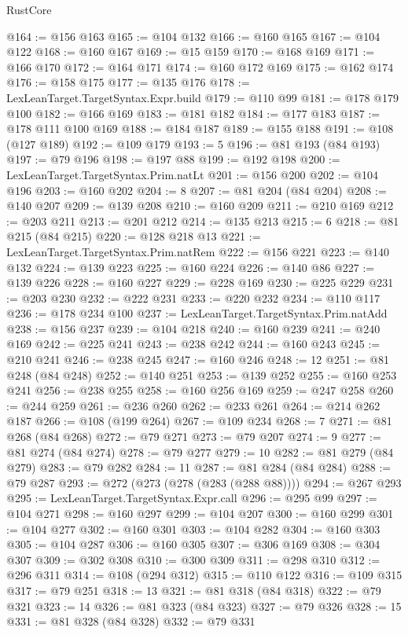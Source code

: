 \begin{lexlean}{RustCore}
\begin{coremodule}
@164 := @156 @163
@165 := @104 @132
@166 := @160 @165
@167 := @104 @122
@168 := @160 @167
@169 := @15 @159
@170 := @168 @169
@171 := @166 @170
@172 := @164 @171
@174 := @160 @172 @169
@175 := @162 @174
@176 := @158 @175
@177 := @135 @176
@178 := LexLeanTarget.TargetSyntax.Expr.build
@179 := @110 @99
@181 := @178 @179 @100
@182 := @166 @169
@183 := @181 @182
@184 := @177 @183
@187 := @178 @111 @100 @169
@188 := @184 @187
@189 := @155 @188
@191 := @108 (@127 @189)
@192 := @109 @179
@193 := 5
@196 := @81 @193 (@84 @193)
@197 := @79 @196
@198 := @197 @88
@199 := @192 @198
@200 := LexLeanTarget.TargetSyntax.Prim.natLt
@201 := @156 @200
@202 := @104 @196
@203 := @160 @202
@204 := 8
@207 := @81 @204 (@84 @204)
@208 := @140 @207
@209 := @139 @208
@210 := @160 @209
@211 := @210 @169
@212 := @203 @211
@213 := @201 @212
@214 := @135 @213
@215 := 6
@218 := @81 @215 (@84 @215)
@220 := @128 @218 @13
@221 := LexLeanTarget.TargetSyntax.Prim.natRem
@222 := @156 @221
@223 := @140 @132
@224 := @139 @223
@225 := @160 @224
@226 := @140 @86
@227 := @139 @226
@228 := @160 @227
@229 := @228 @169
@230 := @225 @229
@231 := @203 @230
@232 := @222 @231
@233 := @220 @232
@234 := @110 @117
@236 := @178 @234 @100
@237 := LexLeanTarget.TargetSyntax.Prim.natAdd
@238 := @156 @237
@239 := @104 @218
@240 := @160 @239
@241 := @240 @169
@242 := @225 @241
@243 := @238 @242
@244 := @160 @243
@245 := @210 @241
@246 := @238 @245
@247 := @160 @246
@248 := 12
@251 := @81 @248 (@84 @248)
@252 := @140 @251
@253 := @139 @252
@255 := @160 @253 @241
@256 := @238 @255
@258 := @160 @256 @169
@259 := @247 @258
@260 := @244 @259
@261 := @236 @260
@262 := @233 @261
@264 := @214 @262 @187
@266 := @108 (@199 @264)
@267 := @109 @234
@268 := 7
@271 := @81 @268 (@84 @268)
@272 := @79 @271
@273 := @79 @207
@274 := 9
@277 := @81 @274 (@84 @274)
@278 := @79 @277
@279 := 10
@282 := @81 @279 (@84 @279)
@283 := @79 @282
@284 := 11
@287 := @81 @284 (@84 @284)
@288 := @79 @287
@293 := @272 (@273 (@278 (@283 (@288 @88))))
@294 := @267 @293
@295 := LexLeanTarget.TargetSyntax.Expr.call
@296 := @295 @99
@297 := @104 @271
@298 := @160 @297
@299 := @104 @207
@300 := @160 @299
@301 := @104 @277
@302 := @160 @301
@303 := @104 @282
@304 := @160 @303
@305 := @104 @287
@306 := @160 @305
@307 := @306 @169
@308 := @304 @307
@309 := @302 @308
@310 := @300 @309
@311 := @298 @310
@312 := @296 @311
@314 := @108 (@294 @312)
@315 := @110 @122
@316 := @109 @315
@317 := @79 @251
@318 := 13
@321 := @81 @318 (@84 @318)
@322 := @79 @321
@323 := 14
@326 := @81 @323 (@84 @323)
@327 := @79 @326
@328 := 15
@331 := @81 @328 (@84 @328)
@332 := @79 @331

\end{coremodule}
\end{lexlean}
